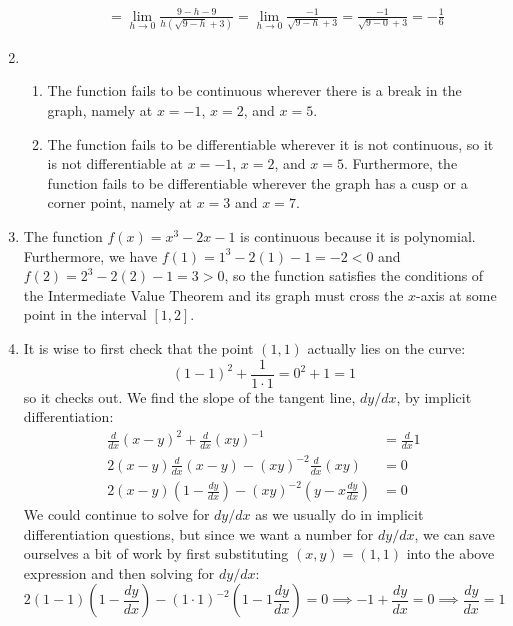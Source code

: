 \documentclass{article}
\begin{document}
\begin{enumerate}
\begin{enumerate}
\begin{multline*}
      \\
      = \lim_{h\to 0} \frac{9-h-9}{h(\sqrt{9-h}+3)}
      = \lim_{h\to 0} \frac{-1}{\sqrt{9-h}+3}
      = \frac{-1}{\sqrt{9-0}+3}
      = -\frac{1}{6}
    \end{multline*}
  \end{enumerate}
\item %
  \begin{enumerate}
  \item %
    The function fails to be continuous wherever there is a break in the 
    graph, namely at $x=-1$, $x=2$, and $x=5$.
  \item %
    The function fails to be differentiable wherever it is not continuous,
    so it is not differentiable at $x=-1$, $x=2$, and $x=5$.  Furthermore,
    the function fails to be differentiable wherever the graph has a cusp
    or a corner point, namely at $x=3$ and $x=7$.
  \end{enumerate}
\item %
  The function $f(x)=x^3-2x-1$ is continuous because it is polynomial.
  Furthermore, we have $f(1) = 1^3-2(1)-1 = -2<0$ and $f(2)= 2^3-2(2)-1=3>0$,
  so the function satisfies the conditions of the Intermediate Value Theorem
  and its graph must cross the $x$-axis at some point in the interval $[1,2]$.
\item %
  It is wise to first check that the point $(1,1)$ actually lies on the curve:
  \begin{equation*}
    (1-1)^2 + \frac{1}{1\cdot 1} = 0^2+ 1 = 1
  \end{equation*}
  so it checks out.
  We find the slope of the tangent line, $dy/dx$, by implicit differentiation:
  \begin{align*}
    \frac{d}{dx} (x-y)^2 + \frac{d}{dx} (xy)^{-1} &= \frac{d}{dx} 1
    \\ 2(x-y) \frac{d}{dx} (x-y) - (xy)^{-2} \frac{d}{dx} (xy) &= 0
    \\ 2(x-y) \left(1-\frac{dy}{dx}\right)
    - (xy)^{-2} \left(y - x\frac{dy}{dx}\right) &= 0
  \end{align*}
  We could continue to solve for $dy/dx$ as we usually do in implicit 
  differentiation questions, but since we want a number for $dy/dx$, we can
  save ourselves a bit of work by first substituting $(x,y)=(1,1)$ into the
  above expression and then solving for $dy/dx$:
  \begin{equation*}
    2(1-1) \left(1-\frac{dy}{dx} \right) - (1\cdot 1)^{-2} 
    \left(1-1\frac{dy}{dx}\right) = 0
    \implies  -1+\frac{dy}{dx} = 0 \implies \frac{dy}{dx} = 1

\end{equation*}
\end{enumerate}
\end{document}
